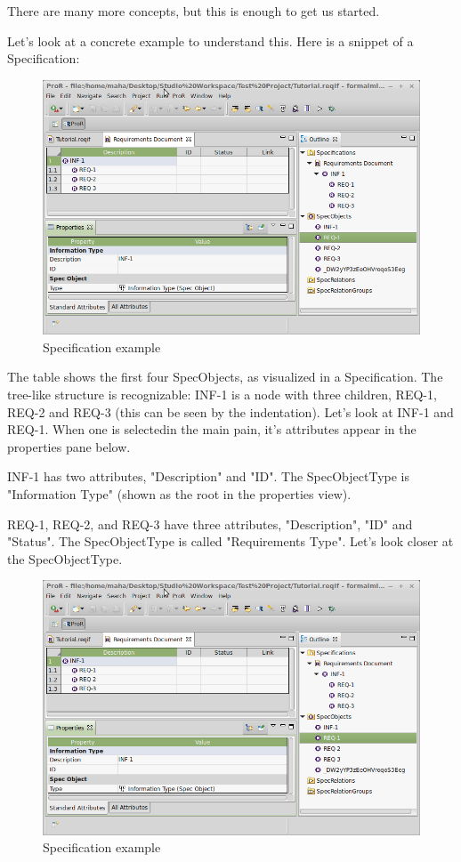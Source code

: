There are many more concepts, but this is enough to get us started.

Let's look at a concrete example to understand this.  Here is a snippet
of a Specification:

\begin{figure}[H]
  \centering
  \includegraphics[width=\textwidth]{../rmf-images/screenshot_INF_1.png}
  \caption{Specification example}
  \label{fig:spec_example}
\end{figure}

The table shows the first four SpecObjects, as visualized in a
Specification.  The tree-like structure is recognizable: INF-1 is a node
with three children, REQ-1, REQ-2 and REQ-3 (this can be seen by the
indentation).  Let's look at INF-1 and REQ-1.  When one is selectedin the main pain, it's attributes appear in the properties pane below.

INF-1 has two attributes, "Description" and "ID".  The SpecObjectType is "Information Type" (shown as the root in the properties view).

REQ-1, REQ-2, and REQ-3 have three attributes, "Description", "ID" and "Status".  The
SpecObjectType is called "Requirements Type".  Let's look closer at the SpecObjectType.

\begin{figure}[H]
  \centering
  \includegraphics[width=\textwidth]{../rmf-images/screenshot_INF_1.png}
  \caption{Specification example}
  \label{fig:spec_example}
\end{figure}

